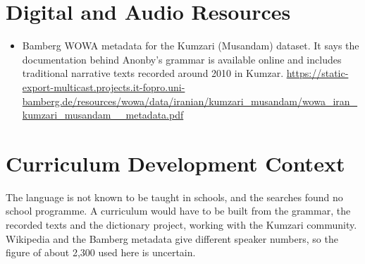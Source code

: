 \documentclass[12pt]{article}
\begin{document}
\section{Digital and Audio Resources}
\begin{itemize}
\item Bamberg WOWA metadata for the Kumzari (Musandam) dataset. It says the documentation behind Anonby's grammar is available online and includes traditional narrative texts recorded around 2010 in Kumzar. \url{https://static-export-multicast.projects.it-fopro.uni-bamberg.de/resources/wowa/data/iranian/kumzari_musandam/wowa_iran_kumzari_musandam__metadata.pdf}
\end{itemize}

\section{Curriculum Development Context}
The language is not known to be taught in schools, and the searches found no school programme. A curriculum would have to be built from the grammar, the recorded texts and the dictionary project, working with the Kumzari community. Wikipedia and the Bamberg metadata give different speaker numbers, so the figure of about 2,300 used here is uncertain.
\end{document}

